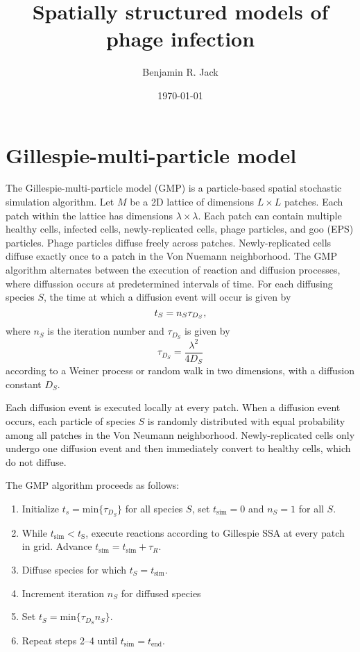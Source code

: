\documentclass{article}
\title{Spatially structured models of phage infection}
\date{\today}
\author{Benjamin R. Jack}
\begin{document}
\maketitle

\section{Gillespie-multi-particle model}
The Gillespie-multi-particle model (GMP) \cite{gmp} is a particle-based spatial stochastic simulation algorithm. Let $M$ be a 2D lattice of dimensions $L \times L$ patches. Each patch within the lattice has dimensions $\lambda \times \lambda$. Each patch can contain multiple healthy cells, infected cells, newly-replicated cells, phage particles, and goo (EPS) particles. Phage particles diffuse freely across patches. Newly-replicated cells diffuse exactly once to a patch in the Von Nuemann neighborhood. The GMP algorithm alternates between the execution of reaction and diffusion processes, where diffussion occurs at predetermined intervals of time. For each diffusing species $S$, the time at which a diffusion event will occur is given by
\begin{equation}
t_{S} = n_{S}\tau_{D_S} \\,
\end{equation}
where $n_S$ is the iteration number and $\tau_{D_S}$ is given by
\begin{equation}
\tau_{D_S} = \frac{\lambda^{2}}{4D_S}
\end{equation}
according to a Weiner process or random walk in two dimensions, with a diffusion constant $D_S$.

Each diffusion event is executed locally at every patch. When a diffusion event occurs, each particle of species $S$ is randomly distributed with equal probability among all patches in the Von Neumann neighborhood. Newly-replicated cells only undergo one diffusion event and then immediately convert to healthy cells, which do not diffuse.

The GMP algorithm proceeds as follows:

\begin{enumerate}
    \item Initialize $t_s = \text{min}\{\tau_{D_S}\}$ for all species $S$, set $t_\text{sim}=0$ and $n_S=1$ for all $S$.
    \item While $t_\text{sim} < t_\text{S}$, execute reactions according to Gillespie SSA at every patch in grid. Advance $t_\text{sim} = t_\text{sim} + \tau_R$.
    \item Diffuse species for which $t_S = t_\text{sim}$.
    \item Increment iteration $n_S$ for diffused species
    \item Set $t_S = \text{min}\{\tau_{D_S}n_S\}$.
    \item Repeat steps 2--4 until $t_\text{sim} = t_\text{end}$.
\end{enumerate}
\end{document}
